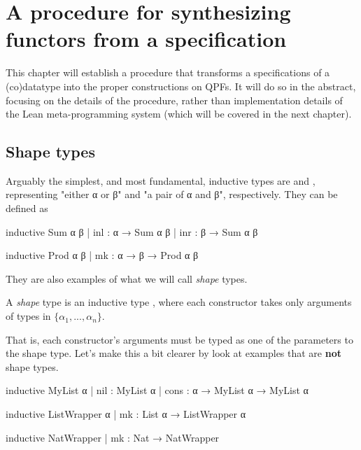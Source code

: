 \documentclass[titlepage]{report}
\newenvironment{definition}[1][Definition:]{\begin{trivlist}                         
    \item[\hskip \labelsep {\bfseries #1}]}{\end{trivlist}}
\begin{document}
\chapter{A procedure for synthesizing functors from a specification}
\label{ch:procedure}

This chapter will establish a procedure that transforms a specifications of a (co)datatype
into the proper constructions on QPFs.
It will do so in the abstract, focusing on the details of the procedure, rather than implementation
details of the Lean meta-programming system (which will be covered in the next chapter).


\section{Shape types}

Arguably the simplest, and most fundamental, inductive types are  and ,
representing "either α or β" and "a pair of α and β", respectively.
They can be defined as

\begin{center}
\begin{minipage}[t]{0.45\linewidth}
    \begin{leancode}
inductive Sum α β
  | inl : α → Sum α β
  | inr : β → Sum α β
    \end{leancode}
\end{minipage}
\begin{minipage}[t]{0.45\linewidth}
    \begin{leancode}    
inductive Prod α β
  | mk : α → β → Prod α β
    \end{leancode}
\end{minipage}
\end{center}

They are also examples of what we will call \emph{shape} types.
\begin{definition}
    A \emph{shape} type is an inductive type , 
    where each constructor takes only arguments of types in $\{α_1, ..., α_n\}$.
\end{definition}
That is, each constructor's arguments must be typed as one of the parameters to the shape type.
Let's make this a bit clearer by look at examples that are \textbf{not} shape types. 

\begin{leancode}
    inductive MyList α
      | nil  : MyList α 
      | cons : α → MyList α → MyList α

    inductive ListWrapper α
      | mk : List α → ListWrapper α

    inductive NatWrapper
      | mk : Nat → NatWrapper
\end{leancode}
\end{document}
